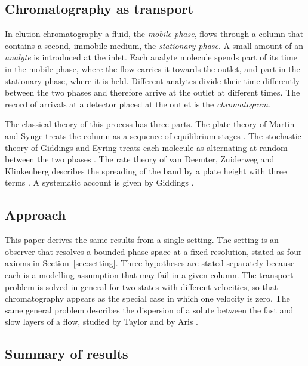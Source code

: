 \documentclass[11pt,a4paper]{article}
\theoremstyle{definition}
\theoremstyle{remark}
\begin{document}
\subsection{Chromatography as transport}

In elution chromatography a fluid, the \emph{mobile phase}, flows through a column that contains a second, immobile medium, the \emph{stationary phase}.
A small amount of an \emph{analyte} is introduced at the inlet.
Each analyte molecule spends part of its time in the mobile phase, where the flow carries it towards the outlet, and part in the stationary phase, where it is held.
Different analytes divide their time differently between the two phases and therefore arrive at the outlet at different times.
The record of arrivals at a detector placed at the outlet is the \emph{chromatogram}.

The classical theory of this process has three parts.
The plate theory of Martin and Synge treats the column as a sequence of equilibrium stages \citep{martin1941}.
The stochastic theory of Giddings and Eyring treats each molecule as alternating at random between the two phases \citep{giddings1955}.
The rate theory of van Deemter, Zuiderweg and Klinkenberg describes the spreading of the band by a plate height with three terms \citep{vandeemter1956}.
A systematic account is given by Giddings \citep{giddings1965}.

\subsection{Approach}

This paper derives the same results from a single setting.
The setting is an observer that resolves a bounded phase space at a fixed resolution, stated as four axioms in Section~\ref{sec:setting}.
Three hypotheses are stated separately because each is a modelling assumption that may fail in a given column.
The transport problem is solved in general for two states with different velocities, so that chromatography appears as the special case in which one velocity is zero.
The same general problem describes the dispersion of a solute between the fast and slow layers of a flow, studied by Taylor and by Aris \citep{taylor1953,aris1956}.

\subsection{Summary of results}
\end{document}
